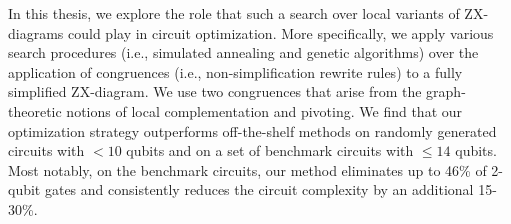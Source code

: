 In this thesis, we explore the role that such a search over local variants of ZX-diagrams could play in circuit optimization.
More specifically, we apply various search procedures (i.e., simulated annealing and genetic algorithms) over the application of congruences (i.e., non-simplification rewrite rules) to a fully simplified ZX-diagram.
We use two congruences that arise from the graph-theoretic notions of local complementation and pivoting.
We find that our optimization strategy outperforms off-the-shelf methods on randomly generated circuits with $<10$ qubits and on a set of benchmark circuits with $\leq 14$ qubits.
Most notably, on the benchmark circuits, our method eliminates up to 46\% of 2-qubit gates and consistently reduces the circuit complexity by an additional 15-30\%.
